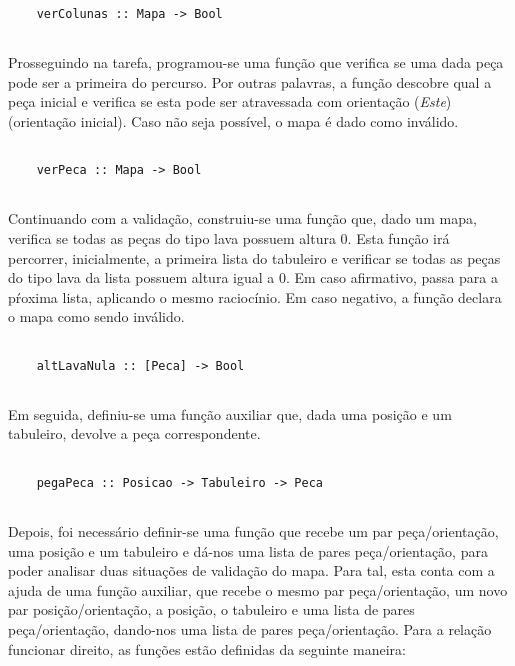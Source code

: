 \documentclass[a4paper]{report} %
\begin{document}
  \begin{verbatim}
    
    verColunas :: Mapa -> Bool
    
  \end{verbatim}

  \par \noindent Prosseguindo na tarefa, programou-se uma função que verifica se uma dada peça pode ser a primeira do percurso. Por outras palavras, a função descobre qual a peça inicial e verifica se esta pode ser atravessada com orientação (\textit{Este}) (orientação inicial). Caso não seja possível, o mapa é dado como inválido.

  \begin{verbatim}
    
    verPeca :: Mapa -> Bool
    
  \end{verbatim}
  
  \newpage

  \par \noindent Continuando com a validação, construiu-se uma função que, dado um mapa, verifica se todas as peças do tipo lava possuem altura 0. Esta função irá percorrer, inicialmente, a primeira lista do tabuleiro e verificar se todas as peças do tipo lava da lista possuem altura igual a 0. Em caso afirmativo, passa para a pŕoxima lista, aplicando o mesmo raciocínio. Em caso negativo, a função declara o mapa como sendo inválido.

  \begin{verbatim}
    
    altLavaNula :: [Peca] -> Bool
    
  \end{verbatim}

  \par \noindent Em seguida, definiu-se uma função auxiliar que, dada uma posição e um tabuleiro, devolve a peça correspondente.

  \begin{verbatim}
    
    pegaPeca :: Posicao -> Tabuleiro -> Peca
    
  \end{verbatim}

  \par \noindent Depois, foi necessário definir-se uma função que recebe um par peça/orientação, uma posição e um tabuleiro e dá-nos uma lista de pares peça/orientação, para poder analisar duas situações de validação do mapa. Para tal, esta conta com a ajuda de uma função auxiliar, que recebe o mesmo par peça/orientação, um novo par posição/orientação, a posição, o tabuleiro e uma lista de pares peça/orientação, dando-nos uma lista de pares peça/orientação. Para a relação funcionar direito, as funções estão definidas da seguinte maneira:
\end{document}
